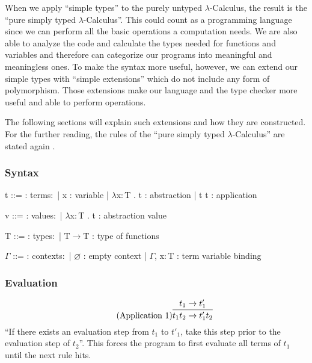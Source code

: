 
When we apply ``simple types'' to the purely untyped
$\lambda$-Calculus, the result is the ``pure simply typed $\lambda$-Calculus''.
This could count as a programming language since we can perform
all the basic operations a computation needs. We are also able to analyze
the code and calculate the types needed for functions and variables
and therefore can categorize our programs into meaningful and
meaningless ones. To make the syntax more useful, however, we can extend
our simple types with ``simple extensions'' which do not include any
form of polymorphism. Those extensions make our language and the type
checker more useful and able to perform operations.

The following sections will explain such extensions and how they are constructed.
For the further reading, the rules of the ``pure simply typed $\lambda$-Calculus''
are stated again \cite{pierce2002ProgLang}.

\subsubsection{Syntax}
\begin{bnfgrammar}
    t ::= : terms$\colon$
    | x : variable
    | $\lambda$x$\colon$T . t : abstraction
    | t t : application
\end{bnfgrammar}\leavevmode\newline

\begin{bnfgrammar}
    v ::= : values$\colon$
    | $\lambda$x$\colon$T . t : abstraction value
\end{bnfgrammar}\leavevmode\newline

\begin{bnfgrammar}
    T ::= : types$\colon$
    | T$\rightarrow$T : type of functions
\end{bnfgrammar}\leavevmode\newline

\begin{bnfgrammar}
    $\Gamma$ ::= : contexts$\colon$
    | $\varnothing$ : empty context
    | $\Gamma$, x$\colon$T : term variable binding
\end{bnfgrammar}\leavevmode\newline

\subsubsection{Evaluation}
\begin{equation*}
    \tag{Application 1}
    \infer{
        t_1 t_2 \rightarrow t'_1 t_2
    }{
        t_1 \rightarrow t'_1
    }
\end{equation*}
``If there exists an evaluation step from $t_1$ to $t'_1$, take this step
prior to the evaluation step of $t_2$''. This forces the program to first
evaluate all terms of $t_1$ until the next rule hits.

